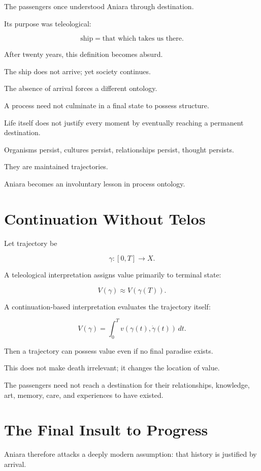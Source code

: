 \documentclass[11pt,oneside]{book}
\theoremstyle{definition}
\theoremstyle{remark}
\begin{document}
The passengers once understood Aniara through destination.

Its purpose was teleological:

\[
\text{ship}
=
\text{that which takes us there}.
\]

After twenty years, this definition becomes absurd.

The ship does not arrive; yet society continues.

The absence of arrival forces a different ontology.

A process need not culminate in a final state to possess structure.

Life itself does not justify every moment by eventually reaching a permanent destination.

Organisms persist, cultures persist, relationships persist, thought persists.

They are maintained trajectories.

Aniara becomes an involuntary lesson in process ontology.

\section{Continuation Without Telos}

Let trajectory be

\[
\gamma:[0,T]\rightarrow X.
\]

A teleological interpretation assigns value primarily to terminal state:

\[
V(\gamma)
\approx
V(\gamma(T)).
\]

A continuation-based interpretation evaluates the trajectory itself:

\[
V(\gamma)
=
\int_0^T
v(\gamma(t),\dot{\gamma}(t))\,dt.
\]

Then a trajectory can possess value even if no final paradise exists.

This does not make death irrelevant; it changes the location of value.

The passengers need not reach a destination for their relationships, knowledge, art, memory, care, and experiences to have existed.

\section{The Final Insult to Progress}

Aniara therefore attacks a deeply modern assumption: that history is justified by arrival.
\end{document}
